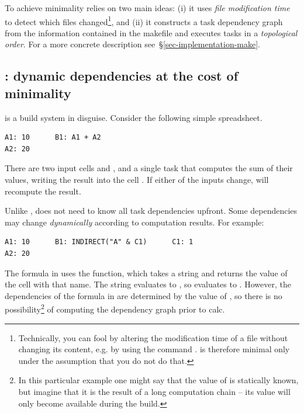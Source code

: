 \label{def-minimal}
\vspace{2mm}

To achieve minimality \Make relies on two main ideas: (i) it uses \emph{file
modification time} to detect which files changed\footnote{Technically, you
can fool \Make by altering the modification time of a file without changing its
content, e.g. by using the command . \Make is therefore minimal only
under the assumption that you do not do that.}, and (ii) it constructs a task
dependency graph from the information contained in the makefile and executes
tasks in a \emph{topological order}. For a more concrete description
see~\S\ref{sec-implementation-make}.

\subsection{\Excel: dynamic dependencies at the cost of minimality}
\label{sec-background-excel}

\Excel is a build system in disguise. Consider the following simple spreadsheet.

\vspace{1mm}
\begin{verbatim}
A1: 10      B1: A1 + A2
A2: 20
\end{verbatim}
\vspace{1mm}

\noindent
There are two input cells  and , and a single task that computes
the sum of their values, writing the result into the cell . If either of
the inputs change, \Excel will recompute the result.

Unlike \Make, \Excel does not need to know all task dependencies upfront. Some
dependencies may change \emph{dynamically} according to computation results. For
example:

\vspace{1mm}
\begin{verbatim}
A1: 10      B1: INDIRECT("A" & C1)      C1: 1
A2: 20
\end{verbatim}
\vspace{1mm}

\noindent
The formula in  uses the  function, which takes a string and
returns the value of the cell with that name.  The string evaluates
to , so  evaluates to . However, the dependencies of the
formula in  are determined by the value of , so there is no
possibility\footnote{In this particular example one might say that
the value of  is statically known, but imagine that it is the result of a long computation
chain -- its value will only become available during the build.}
of computing the dependency graph prior to calc.

